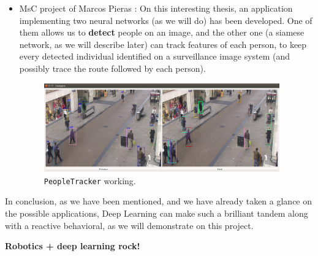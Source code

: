 \begin{itemize}
	\item MsC project of Marcos Pieras \cite{marcospieras}: On this interesting thesis, an application implementing two neural networks (as we will do) has been developed. One of them allows us to \textbf{detect} people on an image, and the other one (a siamese network, as we will describe later) can track features of each person, to keep every detected individual identified on a surveillance image system (and possibly trace the route followed by each person).
	\begin{figure}[h]
		\centering
		\includegraphics[width=4in]{images/people_tracker}
		\caption{\texttt{PeopleTracker} working.}
		\label{fig:1_people_tracker}
	\end{figure}
	
\end{itemize}

In conclusion, as we have been mentioned, and we have already taken a glance on the possible applications, Deep Learning can make such a brilliant tandem along with a reactive behavioral, as we will demonstrate on this project.\\

\begin{center}
	\textbf{Robotics + deep learning rock!}
\end{center}


